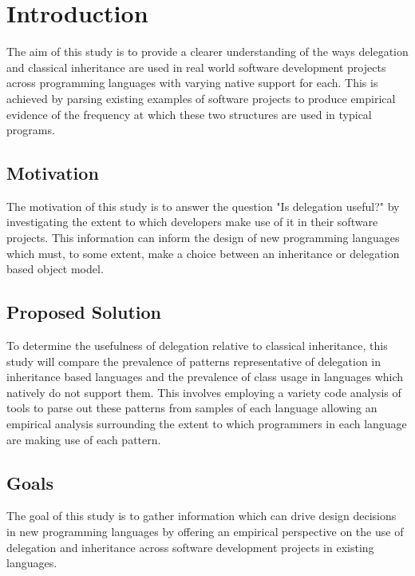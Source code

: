 \chapter{Introduction}\label{C:intro}
The aim of this study is to provide a clearer understanding of the ways delegation and classical inheritance are used in real world software development projects across programming languages with varying native support for each. This is achieved by parsing existing examples of software projects to produce empirical evidence of the frequency at which these two structures are used in typical programs.

\section{Motivation}
The motivation of this study is to answer the question "Is delegation useful?" by investigating the extent to which developers make use of it in their software projects. This information can inform the design of new programming languages which must, to some extent, make a choice between an inheritance or delegation based object model.

\section{Proposed Solution}
To determine the usefulness of delegation relative to classical inheritance, this study will compare the prevalence of patterns representative of delegation in inheritance based languages and the prevalence of class usage in languages which natively do not support them. This involves employing a variety code analysis of tools to parse out these patterns from samples of each language allowing an empirical analysis surrounding the extent to which programmers in each language are making use of each pattern.

\section{Goals}
The goal of this study is to gather information which can drive design decisions in new programming languages by offering an empirical perspective on the use of delegation and inheritance across software development projects in existing languages. 